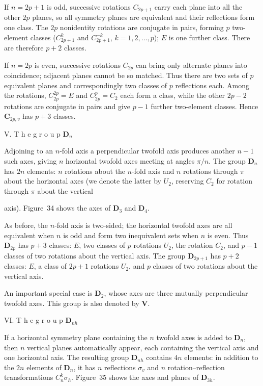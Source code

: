 If $n=2p+1$ is odd, successive rotations $C_{2p+1}$ carry each plane into all the other $2p$ planes, so all symmetry planes are equivalent and their reflections form one class. The $2p$ nonidentity rotations are conjugate in pairs, forming $p$ two-element classes ($C_{2p+1}^k$ and $C_{2p+1}^{-k}$, $k=1,2,\ldots,p$); $E$ is one further class. There are therefore $p+2$ classes.

If $n=2p$ is even, successive rotations $C_{2p}$ can bring only alternate planes into coincidence; adjacent planes cannot be so matched. Thus there are two sets of $p$ equivalent planes and correspondingly two classes of $p$ reflections each. Among the rotations, $C_{2p}^{2p}=E$ and $C_{2p}^p=C_2$ each form a class, while the other $2p-2$ rotations are conjugate in pairs and give $p-1$ further two-element classes. Hence $\boldsymbol{C}_{2p,v}$ has $p+3$ classes.

\medskip
\noindent V. T h e  g r o u p $\boldsymbol{D}_n$

Adjoining to an $n$-fold axis a perpendicular twofold axis produces another $n-1$ such axes, giving $n$ horizontal twofold axes meeting at angles $\pi/n$. The group $\boldsymbol{D}_n$ has $2n$ elements: $n$ rotations about the $n$-fold axis and $n$ rotations through $\pi$ about the horizontal axes (we denote the latter by $U_2$, reserving $C_2$ for rotation through $\pi$ about the vertical

axis). Figure~34 shows the axes of $\boldsymbol{D}_3$ and $\boldsymbol{D}_4$.

As before, the $n$-fold axis is two-sided; the horizontal twofold axes are all equivalent when $n$ is odd and form two inequivalent sets when $n$ is even. Thus $\boldsymbol{D}_{2p}$ has $p+3$ classes: $E$, two classes of $p$ rotations $U_2$, the rotation $C_2$, and $p-1$ classes of two rotations about the vertical axis. The group $\boldsymbol{D}_{2p+1}$ has $p+2$ classes: $E$, a class of $2p+1$ rotations $U_2$, and $p$ classes of two rotations about the vertical axis.

An important special case is $\boldsymbol{D}_2$, whose axes are three mutually perpendicular twofold axes. This group is also denoted by $\boldsymbol{V}$.

\medskip
\noindent VI. T h e  g r o u p $\boldsymbol{D}_{nh}$

If a horizontal symmetry plane containing the $n$ twofold axes is added to $\boldsymbol{D}_n$, then $n$ vertical planes automatically appear, each containing the vertical axis and one horizontal axis. The resulting group $\boldsymbol{D}_{nh}$ contains $4n$ elements: in addition to the $2n$ elements of $\boldsymbol{D}_n$, it has $n$ reflections $\sigma_v$ and $n$ rotation--reflection transformations $C_n^k\sigma_h$. Figure~35 shows the axes and planes of $\boldsymbol{D}_{3h}$.

